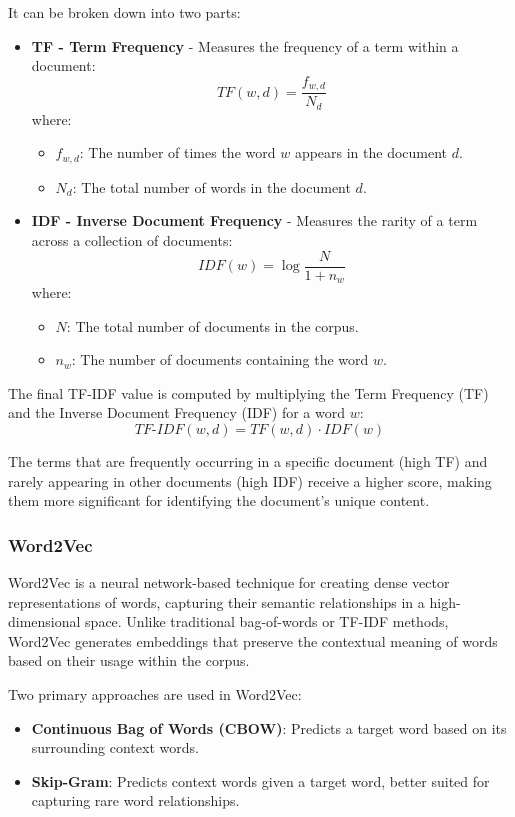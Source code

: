 It can be broken down into two parts:


\begin{itemize}
  \item \textbf{TF - Term Frequency} - Measures the frequency of a term within
    a document:
  \[
  TF(w, d) = \frac{f_{w, d}}{N_d}
  \]
  where:
  \begin{itemize}
    \item \( f_{w, d} \): The number of times the word \( w \) appears in the
      document \( d \).
    \item \( N_d \): The total number of words in the document \( d \).
  \end{itemize}

  \item \textbf{IDF - Inverse Document Frequency} - Measures the rarity of a
    term across a collection of documents:
  \[
  IDF(w) = \log{\frac{N}{1 + n_w}}
  \]
  where:
  \begin{itemize}
    \item \( N \): The total number of documents in the corpus.
    \item \( n_w \): The number of documents containing the word \( w \).
  \end{itemize}
\end{itemize}


The final TF-IDF value is computed by multiplying the Term Frequency (TF) and
the Inverse Document Frequency (IDF) for a word \( w \):  
\[  
TF\text{-}IDF(w, d) = TF(w, d) \cdot IDF(w)  
\]  

The terms that are frequently occurring in a specific document (high TF) and
rarely appearing in other documents (high IDF) receive a higher score, making
them more significant for identifying the document's unique content.


\subsubsection*{Word2Vec}

Word2Vec is a neural network-based technique for creating dense
vector representations of words, capturing their semantic relationships in a
high-dimensional space. Unlike traditional bag-of-words or TF-IDF methods,
Word2Vec generates embeddings that preserve the contextual meaning of words
based on their usage within the corpus.\cite{w2v}

Two primary approaches are used in Word2Vec: 
\begin{itemize} 
  \item \textbf{Continuous Bag of Words (CBOW)}: Predicts a target word based
    on its surrounding context words. 
  \item \textbf{Skip-Gram}: Predicts context words given a target word, better
    suited for capturing rare word relationships.
\end{itemize}

